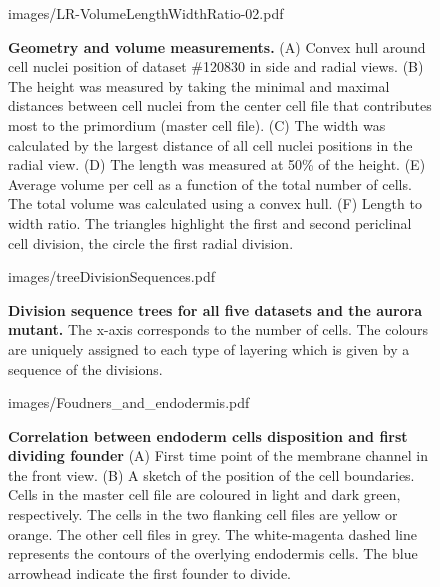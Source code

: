 \documentclass[11pt,a4paper, draft]{article}
\begin{document}
%
\clearpage
%
\begin{figure}[htbp]
	\begin{center}
	\begin{overpic}[width=1.\linewidth]{images/LR-VolumeLengthWidthRatio-02.pdf}
	\end{overpic}
\caption[Geometry and volume measurements.]
{{\bf Geometry and volume measurements.} (A) Convex hull around cell nuclei position of dataset \#120830 in side and radial views. (B) The height was measured by taking the minimal and maximal distances between cell nuclei from the center cell file that contributes most to the primordium (master cell file). (C) The width was calculated by the largest distance of all cell nuclei positions in the radial view. (D) The length was measured at 50\% of the height. (E) Average volume per cell as a function of the total number of cells. The total volume was calculated using a convex hull. (F) Length to width ratio. The triangles highlight the first and second periclinal cell division, the circle the first radial division.}
	\label{fig:VLWR}
	\end{center}
\end{figure}
%
\clearpage
%
\begin{figure}[htbp]
	\begin{center}
		\begin{overpic}[width=1.\linewidth]{images/treeDivisionSequences.pdf}
		\end{overpic}
\caption[Division sequence trees for all five datasets and the aurora mutant.]
{
{\bf Division sequence trees for all five datasets and the aurora mutant.} The x-axis corresponds to the number of cells. The colours are uniquely assigned to each type of layering which is given by a sequence of the divisions.}
	\label{fig:treeDivisionSequences}
	\end{center}
\end{figure}
%
\clearpage
%
\begin{figure}[htbp]
	\begin{center}
	\begin{overpic}[width=0.5\linewidth]{images/Foudners_and_endodermis.pdf}
	\end{overpic}
\caption[Correlation between endoderm cells disposition and first dividing founder.]
{{\bf Correlation between endoderm cells disposition and first dividing founder} (A) First time point of the membrane channel in the front view. (B) A sketch of the position of the cell boundaries. Cells in the master cell file are coloured in light and dark green, respectively. The cells in the two flanking cell files are yellow or orange. The other cell files in grey. The white-magenta dashed line represents the contours of the overlying endodermis cells. The blue arrowhead indicate the first founder to divide.}
	\label{fig:foundersendo}
	\end{center}
\end{figure}
%
\clearpage
\end{document}
